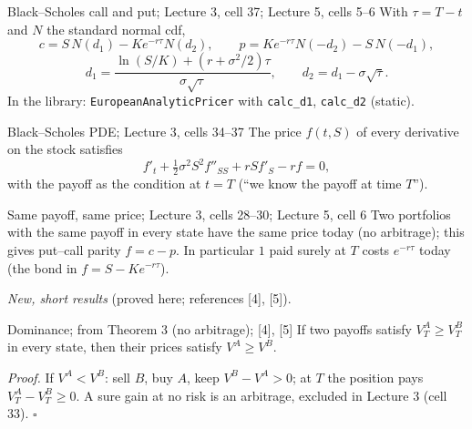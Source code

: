 \documentclass[11pt,a4paper]{article}
\newcommand{\DF}{e^{-r\tau}}
\begin{document}
\begin{thmbox}{Black--Scholes call and put; Lecture 3, cell 37; Lecture 5, cells 5--6}
With $\tau=T-t$ and $N$ the standard normal cdf,
\begin{equation}\label{eq:bs}
c=S\,N(d_1)-K\DF N(d_2),\qquad p=K\DF N(-d_2)-S\,N(-d_1),
\end{equation}
\begin{equation}\label{eq:d}
d_1=\frac{\ln(S/K)+(r+\sigma^2/2)\tau}{\sigma\sqrt\tau},\qquad d_2=d_1-\sigma\sqrt\tau .
\end{equation}
In the library: \texttt{EuropeanAnalyticPricer} with \texttt{calc\_d1}, \texttt{calc\_d2} (static).
\end{thmbox}

\begin{thmbox}{Black--Scholes PDE; Lecture 3, cells 34--37}
The price $f(t,S)$ of every derivative on the stock satisfies
\begin{equation}\label{eq:pde}
f'_t+\tfrac12\sigma^2S^2f''_{SS}+rSf'_S-rf=0,
\end{equation}
with the payoff as the condition at $t=T$ (``we know the payoff at time $T$'').
\end{thmbox}

\begin{thmbox}{Same payoff, same price; Lecture 3, cells 28--30; Lecture 5, cell 6}
Two portfolios with the same payoff in every state have the same price today (no arbitrage); this gives put--call parity $f=c-p$. In particular $1$ paid surely at $T$ costs $\DF$ today (the bond in $f=S-K\DF$).
\end{thmbox}

\noindent\emph{New, short results} (proved here; references [4], [5]).

\begin{lembox}{Dominance; from Theorem 3 (no arbitrage); [4], [5]}
If two payoffs satisfy $V_T^A\ge V_T^B$ in every state, then their prices satisfy $V^A\ge V^B$.
\end{lembox}
\noindent\emph{Proof.} If $V^A<V^B$: sell $B$, buy $A$, keep $V^B-V^A>0$; at $T$ the position pays $V_T^A-V_T^B\ge0$. A sure gain at no risk is an arbitrage, excluded in Lecture 3 (cell 33). \hfill$\square$
\end{document}
